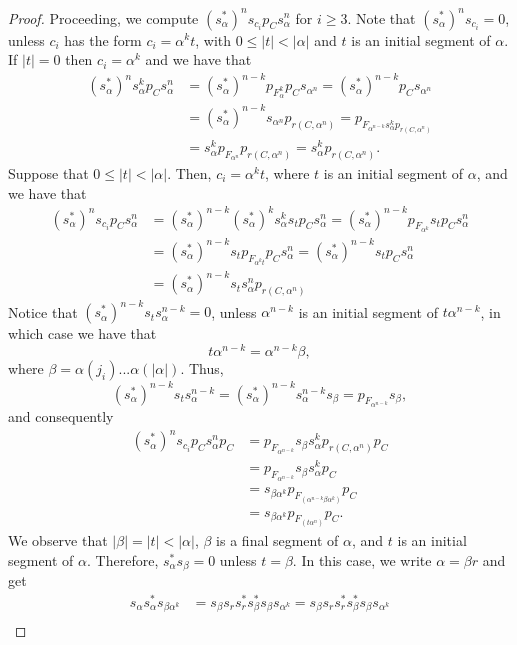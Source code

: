 \documentclass[a4paper,12pt]{amsart}
\theoremstyle{definition}
\theoremstyle{remark}
\numberwithin{equation}{section}
\begin{document}
\begin{proof}
Proceeding, we compute $(s_\alpha ^*)^ns_{c_i}p_C s_{\alpha}^n$ for $i\geq 3$. Note that $(s_\alpha ^*)^ns_{c_i}=0$, unless $c_i$ has the form $c_i=\alpha^k t$, with $0\leq |t|<|\alpha|$ and $t$ is an initial segment of $\alpha$. 
If $|t|=0$ then $c_i=\alpha^k$ and we have that
\begin{align*} (s_\alpha^*)^ns_\alpha^kp_C s_\alpha^n &=(s_\alpha^*)^{n-k}p_{F_{\alpha}^k}p_Cs_{\alpha^n}=(s_\alpha^*)^{n-k}p_Cs_{\alpha^n}\\
& =(s_\alpha^*)^{n-k}s_{\alpha^n}p_{r(C,\alpha^n)} = p_{F_{\alpha^{n-k}}s_{\alpha}^kp_{r(C,\alpha^n)}} \\
&= s_\alpha^k p_{F_{\alpha^n}}p_{r(C,\alpha^n)}=s_\alpha^k p_{r(C,\alpha^n)}.
\end{align*}
Suppose that $0\leq |t|<|\alpha|$. Then, $c_i=\alpha^k t$, where $t$ is an initial segment of $\alpha$, and we have that
\begin{align*}
 (s_\alpha^*)^ns_{c_i}p_Cs_\alpha^n &=(s_\alpha^*)^{n-k}(s_\alpha^*)^k s_\alpha^k s_{t} p_C s_\alpha^n=(s_\alpha^*)^{n-k} p_{F_{\alpha^k}} s_{t} p_C s_\alpha^n\\
 &=(s_\alpha^*)^{n-k} s_{t} p_{F_{\alpha^k t}} p_C s_\alpha^n=(s_\alpha^*)^{n-k} s_{t} p_C s_\alpha^n\\
 &=(s_\alpha^*)^{n-k} s_{t}  s_\alpha^n p_{r(C, \alpha^n)}
\end{align*}
Notice that $(s_{\alpha}^*)^{n-k} s_{t} s_\alpha^{n-k}=0$, unless $\alpha^{n-k}$ is an initial segment of $t\alpha^{n-k}$, in which case we have that $$t \alpha^{n-k}=\alpha^{n-k} \beta,$$ where $\beta=\alpha(j_i)...\alpha(|\alpha|)$. Thus,
$$(s_{\alpha}^*)^{n-k} s_{t} s_\alpha^{n-k}=
(s_{\alpha}^*)^{n-k} s_\alpha^{n-k}s_{\beta}=
 p_{F_{\alpha^{n-k}}} s_{\beta},$$
and consequently
\begin{align*}
(s_\alpha^*)^ns_{c_i}p_Cs_\alpha^n p_C&=p_{F_{\alpha^{n-k}}}s_{\beta}s_{\alpha}^kp_{r(C,\alpha^n)}p_C  \\
&=p_{F_{\alpha^{n-k}}}s_{\beta}s_{\alpha}^k p_C\\
&=s_{\beta \alpha^k}p_{F_{(\alpha^{n-k}\beta \alpha^k)}}p_C\\
&=s_{\beta \alpha^k}p_{F_{(t \alpha^n)}}p_C.
\end{align*}
We observe that $|\beta|=|t|<|\alpha|$, $\beta$ is a final segment of $\alpha$, and $t$ is an initial segment of $\alpha$.  
Therefore, $s_\alpha^* s_\beta=0$ unless $t=\beta$. In this case, we write $\alpha=\beta r$ and get 
\begin{align*}
s_\alpha s_\alpha^* s_{\beta \alpha^k}&=s_\beta s_r s_r^* s_\beta^* s_\beta s_{\alpha^k}=s_\beta s_r s_r^* s_\beta^* s_\beta s_{\alpha^k}  \\

\end{align*}
\end{proof}
\end{document}
